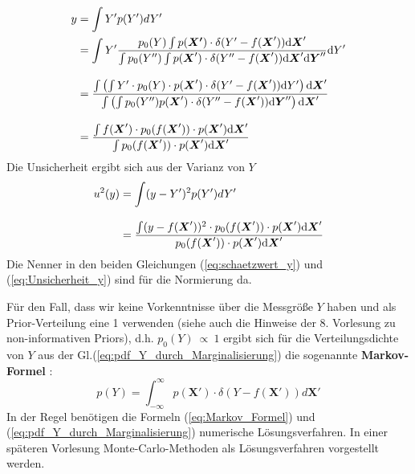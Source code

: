 \begin{align}
y &= \int Y' p(Y') dY' \nonumber\\ 
&=  \int Y'\frac{\textstyle p_0(Y) \int p(\boldsymbol{X'}) \cdot \delta(Y'-f(\boldsymbol{X}')) \mathrm{d} \boldsymbol{X}' }
{\textstyle \int p_0(Y'')\int  p(\boldsymbol{X}') \cdot \delta(Y''-f(\boldsymbol{X}')) \mathrm{d} \boldsymbol{X}'\mathrm{d} \boldsymbol{Y}'' } \mathrm{d} Y'  \nonumber \\[2ex]
&= \frac{\textstyle\int \left( \int Y' \cdot p_0(Y) \cdot p(\boldsymbol{X}') \cdot \delta(Y'-f(\boldsymbol{X}'))\mathrm{d}Y' \right) \mathrm{d} \boldsymbol{X}' }
{\textstyle \int \left(\int p_0(Y'') p(\boldsymbol{X}') \cdot \delta(Y''-f(\boldsymbol{X}')) \mathrm{d}  \boldsymbol{Y}'' \right) \mathrm{d} \boldsymbol{X}'}\nonumber \\[2ex]  
&=  \frac{\textstyle\int f(\boldsymbol{X}') \cdot p_0(f(\boldsymbol{X}')) \cdot p(\boldsymbol{X}')  \mathrm{d} \boldsymbol{X}' }
{\textstyle \int   p_0(f(\boldsymbol{X}')) \cdot p(\boldsymbol{X}') 
	\mathrm{d} \boldsymbol{X}'}  \label{eq:schaetzwert_y}
\end{align}
Die Unsicherheit ergibt sich aus der Varianz von $Y$  
\begin{align}
u^2(y) &= \int (y-Y')^2 p(Y') dY' \nonumber \\[2ex]
&= \frac{\textstyle \int (y-f(\boldsymbol{X}'))^2 \cdot p_0(f(\boldsymbol{X}'))
	\cdot p(\boldsymbol{X}') \mathrm{d} \boldsymbol{X}' }
{\textstyle p_0(f(\boldsymbol{X}')) \cdot p(\boldsymbol{X}') \mathrm{d} \boldsymbol{X}'}  
\label{eq:Unsicherheit_y}
\end{align}
Die Nenner in den beiden Gleichungen (\ref{eq:schaetzwert_y}) und
(\ref{eq:Unsicherheit_y}) sind für die Normierung da.

Für den Fall, dass wir keine Vorkenntnisse über die Messgröße $Y$
haben und als Prior-Verteilung eine 1 verwenden (siehe auch 
die Hinweise der 8. Vorlesung zu non-informativen Priors), d.h.
$p_0(Y)~\propto~1$ ergibt sich für die Verteilungsdichte von $Y$ aus
der Gl.(\ref{eq:pdf_Y_durch_Marginalisierung}) die sogenannte 
\textbf{Markov-Formel} \cite{Cox06}: 
\begin{equation}
p(Y) = \int_{-\infty}^{\infty} 
p(\boldsymbol{X}') \cdot \delta (Y-f(\boldsymbol{X}')) d \boldsymbol{X}'
\label{eq:Markov_Formel}
\end{equation}
In der Regel benötigen die Formeln (\ref{eq:Markov_Formel}) und (\ref{eq:pdf_Y_durch_Marginalisierung}) numerische Lösungsverfahren. In 
einer späteren Vorlesung Monte-Carlo-Methoden als Lösungsverfahren vorgestellt werden.

